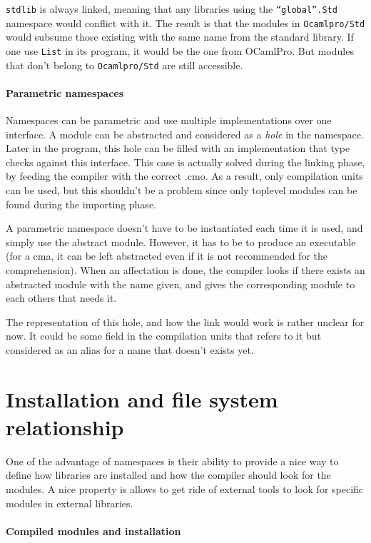 \documentclass[11pt,a4paper]{article}
\begin{document}
\texttt{stdlib} is always linked, meaning that any libraries using the
\texttt{``global''.Std} namespace would conflict with it. The result is that the
modules in \texttt{Ocamlpro/Std} would subsume those existing with the same name
from the standard library. If one use \texttt{List} in its program, it would
be the one from OCamlPro. But modules that don't belong to \texttt{Ocamlpro/Std}
are still accessible.


\paragraph{Parametric namespaces}

Namespaces can be parametric and use multiple implementations over one
interface. A module can be abstracted and considered as a \emph{hole} in the
namespace. Later in the program, this hole can be filled with an implementation
that type checks against this interface. This case is actually solved during the
linking phase, by feeding the compiler with the correct .cmo. As a result, only
compilation units can be used, but this shouldn't be a problem since only
toplevel modules can be found during the importing phase.

A parametric namespace doesn't have to be instantiated each time it is used, and
simply use the abstract module. However, it has to be to produce an executable
(for a cma, it can be left abstracted even if it is not recommended for the
comprehension). When an affectation is done, the compiler looks if there exists
an abstracted module with the name given, and gives the corresponding module to
each others that needs it.

The representation of this hole, and how the link would work is rather unclear
for now. It could be some field in the compilation units that refers to it but
considered as an alias for a name that doesn't exists yet.

\section{Installation and file system relationship}

One of the advantage of namespaces is their ability to provide a nice way to
define how libraries are installed and how the compiler should look for the
modules. A nice property is allows to get ride of external tools to look for
specific modules in external libraries.

\paragraph{Compiled modules and installation}
\end{document}
